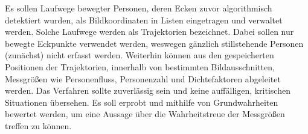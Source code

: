 Es sollen Laufwege bewegter Personen, deren Ecken zuvor algorithmisch detektiert wurden, als Bildkoordinaten in Listen eingetragen und verwaltet werden. Solche Laufwege werden als Trajektorien bezeichnet. Dabei sollen nur bewegte Eckpunkte verwendet werden, weswegen gänzlich stillstehende Personen (zunächst) nicht erfasst werden. Weiterhin können aus den gespeicherten Positionen der Trajektorien, innerhalb von bestimmten Bildausschnitten, Messgrößen wie Personenfluss, Personenzahl und Dichtefaktoren abgeleitet werden. Das Verfahren sollte zuverlässig sein und keine auffälligen, kritischen Situationen übersehen. Es soll erprobt und mithilfe von Grundwahrheiten bewertet werden, um eine Aussage über die Wahrheitstreue der Messgrößen treffen zu können.





